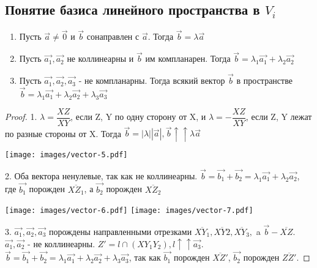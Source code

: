 \subsection{Понятие базиса линейного пространства в $V_i$}
\begin{proposition}
	\begin{enumerate}
		\item Пусть $\vec{a}\ne\vec{0}$ и $\vec{b}$ сонаправлен с $\vec{a}$.
		Тогда $\vec{b} = \lambda \vec{a}$
		\item Пусть $\vec{a_1}, \vec{a_2}$ не коллинеарны и $\vec{b}$ им компланарен. Тогда $\vec{b} = \lambda_1\vec{a_1} + \lambda_2\vec{a_2}$
		\item Пусть $\vec{a_1}, \vec{a_2}, \vec{a_3}$ - не компланарны. Тогда всякий вектор $\vec{b}$ в пространстве $\vec{b} = \lambda_1\vec{a_1} + \lambda_2\vec{a_2}+\lambda_3\vec{a_3}$
	\end{enumerate}
\end{proposition}
\newpage
	\begin{proof}
		 1. $\lambda = \dfrac{XZ}{XY}$, если Z, Y по одну сторону от X, и $\lambda = - \dfrac{XZ}{XY}$, если Z, Y лежат по разные стороны от X. Тогда $\vec{b} = |\lambda||\vec{a}|, \vec{b}\uparrow\uparrow \lambda\vec{a}$
		
		\vspace{.7cm}
		\begin{center}
		\texttt{[image: images/vector-5.pdf]}
		\label{Vector5}
		\end{center}
		\vspace{.7cm}
			
		2. Оба вектора ненулевые, так как не коллинеарны.
		$\vec{b} = \vec{b_1}+\vec{b_2} = \lambda_1\vec{a_1} + \lambda_2\vec{a_2}$, где $\vec{b_1}$ порожден $\overline{XZ_1}$, а $\vec{b_2}$ порожден $\overline{XZ_2}$
			
		 \vspace{.7cm}
		 \hspace{.5cm}\texttt{[image: images/vector-6.pdf]} \hfil	\texttt{[image: images/vector-7.pdf]}
		 \vspace{.7cm}
		 
		 3. $\vec{a_1}, \vec{a_2}, \vec{a_3}$ порождены направленными отрезками $\overline{XY_1}, \overline{XY2}, \overline{XY_3}, $ a $\vec{b} - \overline{XZ}$. $\vec{a_1}, \vec{a_2}$ - не коллинеарны. \(Z' = l\cap(XY_1Y_2), l \uparrow\uparrow \vec{a_3}\). $\vec{b} = \vec{b_1}+\vec{b_2} = \lambda_1 \vec{a_1} + \lambda_2\vec{a_2}+\lambda_3\vec{a_3}$, так как $\vec{b_1}$ порожден $\overline{XZ'}$, $\vec{b_2}$ порожден $\overline{ZZ'}$.
			
	\end{proof}
